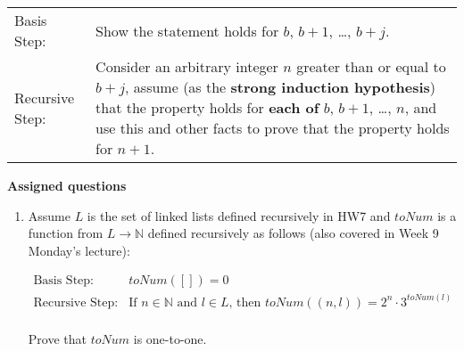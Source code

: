 \documentclass[12pt, oneside]{article}
\begin{document}
\begin{tabularx}{\textwidth}{l X}
    Basis Step: & Show the statement holds for $b$, $b+1$, \ldots, $b+j$. \\
    Recursive Step: & Consider an arbitrary integer $n$ greater than or  equal to  $b+j$, assume
    (as the {\bf strong  induction hypothesis})  that the property holds  for {\bf each of} $b$, $b+1$, \ldots, $n$, 	
    and use  this and
    other facts to  prove that  the property holds for $n+1$.
\end{tabularx}
\newpage


{\bf Assigned questions}

\begin{enumerate}

\item Assume $L$ is the set of linked lists defined recursively in HW7 and $toNum$ is a function from $L \to \mathbb{N}$ defined recursively as follows (also covered in Week 9 Monday's lecture):

\[
\begin{array}{ll}
\textrm{Basis Step: } &   toNum([])  = 0\\

\textrm{Recursive Step: } & \textrm{If } n \in \mathbb{N} \textrm{ and } l \in L \textrm{, then } toNum((n, l))  = 2^n \cdot 3^{toNum(l)}\\
\end{array}
\]


Prove that $toNum$ is one-to-one.


\end{enumerate}
\end{document}

